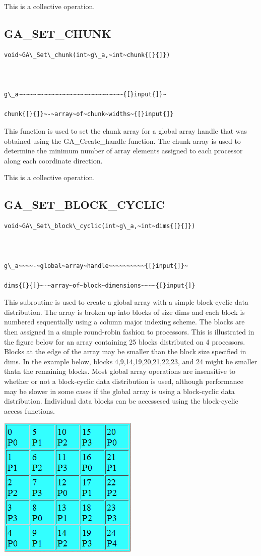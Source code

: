 This is a collective operation. 


\subsection*{\label{sub:GA_SET_CHUNK}GA\_SET\_CHUNK}
\begin{verbatim}
void~GA\_Set\_chunk(int~g\_a,~int~chunk{[}{]})



g\_a~~~~~~~~~~~~~~~~~~~~~~~~~~~~~{[}input{]}~

chunk{[}{]}~-~array~of~chunk~widths~{[}input{]}
\end{verbatim}
This function is used to set the chunk array for a global array handle
that was obtained using the GA\_Create\_handle function. The chunk
array is used to determine the minimum number of array elements assigned
to each processor along each coordinate direction.

This is a collective operation. 


\subsection*{\label{sub:GA_SET_BLOCK_CYCLIC}GA\_SET\_BLOCK\_CYCLIC}
\begin{verbatim}
void~GA\_Set\_block\_cyclic(int~g\_a,~int~dims{[}{]})



g\_a~~~~-~global~array~handle~~~~~~~~~~{[}input{]}~

dims{[}{]}~-~array~of~block~dimensions~~~~{[}input{]}
\end{verbatim}
This subroutine is used to create a global array with a simple block-cyclic
data distribution. The array is broken up into blocks of size dims
and each block is numbered sequentially using a column major indexing
scheme. The blocks are then assigned in a simple round-robin fashion
to processors. This is illustrated in the figure below for an array
containing 25 blocks distributed on 4 processors. Blocks at the edge
of the array may be smaller than the block size specified in dims.
In the example below, blocks 4,9,14,19,20,21,22,23, and 24 might be
smaller thatn the remaining blocks. Most global array operations are
insensitive to whether or not a block-cyclic data distribution is
used, although performance may be slower in some cases if the global
array is using a block-cyclic data distribution. Individual data blocks
can be accessesed using the block-cyclic access functions.

\includegraphics{Set_Block_Cyclic}

